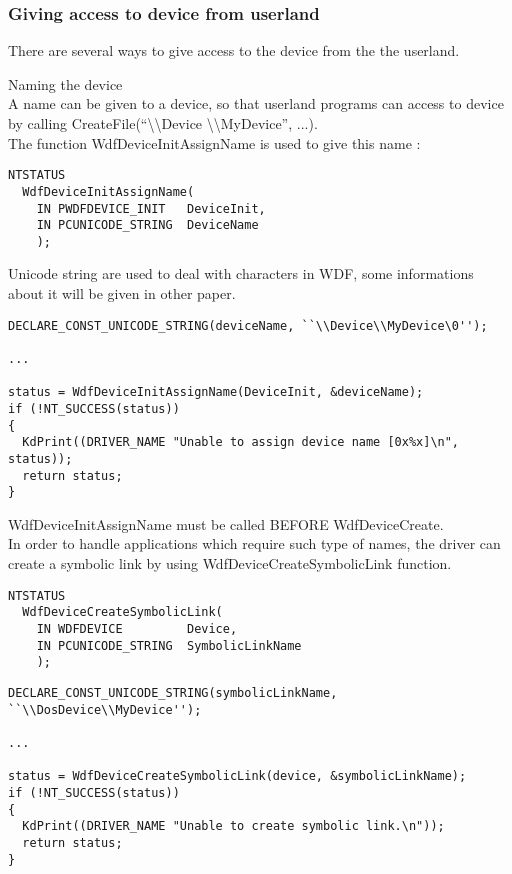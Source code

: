 \documentclass[11pt]{report}
\begin{document}
     \subsubsection{Giving access to device from userland}
There are several ways to give access to the device from the the userland.

\begin{description}
\item{Naming the device\\}
A name can be given to a device, so that userland programs can
access to device by calling
CreateFile(``\textbackslash \textbackslash Device
\textbackslash \textbackslash MyDevice'', ...).\\
The function WdfDeviceInitAssignName is used to give this name :
\begin{lstlisting}
NTSTATUS
  WdfDeviceInitAssignName(
    IN PWDFDEVICE_INIT   DeviceInit,
    IN PCUNICODE_STRING  DeviceName
    );
\end{lstlisting}
Unicode string are used to deal with characters in WDF, some informations about
it will be given in other paper.
\begin{lstlisting}
DECLARE_CONST_UNICODE_STRING(deviceName, ``\\Device\\MyDevice\0'');

...

status = WdfDeviceInitAssignName(DeviceInit, &deviceName);
if (!NT_SUCCESS(status))
{
  KdPrint((DRIVER_NAME "Unable to assign device name [0x%x]\n", status));
  return status;
}
\end{lstlisting}
WdfDeviceInitAssignName must be called BEFORE WdfDeviceCreate.\\
In order to handle applications which require such type of names,
the driver can create a symbolic link by using WdfDeviceCreateSymbolicLink
function.
\begin{lstlisting}
NTSTATUS
  WdfDeviceCreateSymbolicLink(
    IN WDFDEVICE         Device,
    IN PCUNICODE_STRING  SymbolicLinkName
    );
\end{lstlisting}

\begin{lstlisting}
DECLARE_CONST_UNICODE_STRING(symbolicLinkName, ``\\DosDevice\\MyDevice'');

...

status = WdfDeviceCreateSymbolicLink(device, &symbolicLinkName);
if (!NT_SUCCESS(status))
{
  KdPrint((DRIVER_NAME "Unable to create symbolic link.\n"));
  return status;
}
\end{lstlisting}


\end{description}
\end{document}
